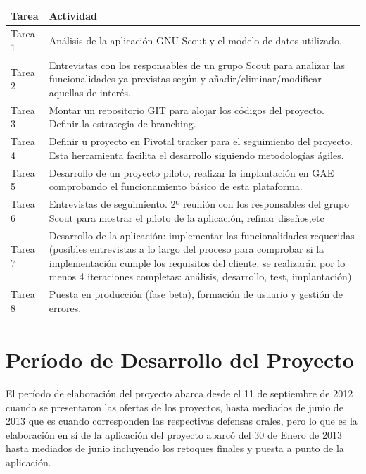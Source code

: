 \begin{tabular}{|p{25mm}|p{80mm}|} \hline 
\textbf{Tarea } & \textbf{Actividad} \\ \hline
Tarea 1 &
Análisis de la aplicación GNU Scout y el modelo de datos utilizado.
\\
\hline

Tarea 2 &
Entrevistas con los responsables de un grupo Scout para analizar las funcionalidades ya
previstas según y añadir/eliminar/modificar aquellas de interés.
\\
\hline

Tarea 3 &
Montar un repositorio GIT para alojar los códigos del proyecto. Definir la
estrategia de branching.
\\
\hline

Tarea 4 &
Definir u proyecto en Pivotal tracker para el seguimiento del proyecto. Esta herramienta
facilita el desarrollo siguiendo metodologías ágiles.
\\
\hline

Tarea 5 & 
Desarrollo de un proyecto piloto, realizar la implantación en GAE comprobando el 
funcionamiento básico de esta plataforma.
\\
\hline

Tarea 6 &
Entrevistas de seguimiento. 2º reunión con los responsables del grupo Scout para
mostrar el piloto de la aplicación, refinar diseños,etc
\\
\hline

Tarea 7 &
Desarrollo de la aplicación: implementar las funcionalidades requeridas (posibles
entrevistas a lo largo del proceso para comprobar si la implementación cumple los requisitos
del cliente: se realizarán por lo menos 4 iteraciones completas: análisis, desarrollo, test, implantación)
\\
\hline

Tarea 8 &
Puesta en producción (fase beta), formación de usuario y gestión de errores.
\\
\hline

\end{tabular}


\section{Período de Desarrollo del Proyecto}
\label{1:sec:4}

El período de elaboración del proyecto abarca desde el 11 de septiembre de 2012 cuando se presentaron las ofertas de los proyectos, 
hasta mediados de junio de 2013 que es cuando corresponden las respectivas defensas orales, pero lo que es la elaboración en sí de la aplicación del proyecto
abarcó del 30 de Enero de 2013 hasta mediados de junio incluyendo los retoques finales y puesta a punto de la aplicación.\\

